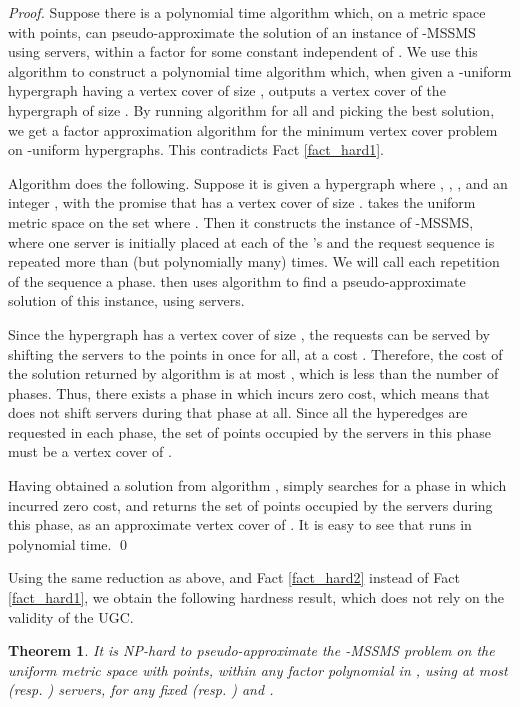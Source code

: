 \documentclass[11pt]{article}
\theoremstyle{plain}\newtheorem{theorem}{Theorem}
\theoremstyle{definition}
\theoremstyle{remark}
\begin{document}
\begin{proof}
Suppose there is a polynomial time algorithm  which, on a metric space with  points, can pseudo-approximate the solution of an instance of -MSSMS using  servers, within a factor  for some constant  independent of . We use this algorithm to construct a polynomial time algorithm  which, when given a -uniform hypergraph having a vertex cover of size , outputs a vertex cover of the hypergraph of size . By running algorithm  for all  and picking the best solution, we get a factor  approximation algorithm for the minimum vertex cover problem on -uniform hypergraphs. This contradicts Fact \ref{fact_hard1}.

Algorithm  does the following. Suppose it is given a hypergraph  where , ,  , and an integer , with the promise that  has a vertex cover of size .  takes the uniform metric space on the set  where . Then it constructs the instance of -MSSMS, where one server is initially placed at each of the 's and the request sequence is  repeated more than  (but polynomially many) times. We will call each repetition of the sequence  a phase.  then uses algorithm  to find a pseudo-approximate solution of this instance, using  servers.

Since the hypergraph has a vertex cover  of size , the requests can be served by shifting the servers to the points in  once for all, at a cost . Therefore, the cost of the solution returned by algorithm  is at most , which is less than the number of phases. Thus, there exists a phase in which  incurs zero cost, which means that  does not shift servers during that phase at all. Since all the hyperedges are requested in each phase, the set of points occupied by the  servers in this phase must be a vertex cover of .


Having obtained a solution from algorithm ,  simply searches for a phase in which  incurred zero cost, and returns the set of  points occupied by the servers during this phase, as an approximate vertex cover of . It is easy to see that 
 runs in polynomial time. \qed
\end{proof}

Using the same reduction as above, and Fact \ref{fact_hard2} instead of Fact \ref{fact_hard1}, we obtain the following hardness result, which does not rely on the validity of the UGC.

\begin{theorem}
It is NP-hard to pseudo-approximate the -MSSMS problem on the uniform metric space with  points, within any factor polynomial in , using at most  (resp. ) servers, for any fixed  (resp. ) and .
\end{theorem}
\end{document}
